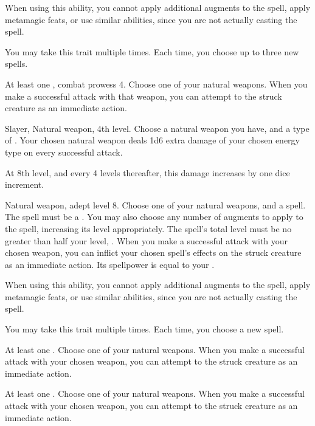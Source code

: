     When using this ability, you cannot apply additional augments to the spell, apply metamagic feats, or use similar abilities, since you are not actually casting the spell.

     You may take this trait multiple times.
    Each time, you choose up to three new spells.

    \featpre At least one , combat prowess 4.
    \featben Choose one of your natural weapons.
    When you make a successful attack with that weapon, you can attempt to  the struck creature as an immediate action.

    \featpre Slayer, Natural weapon, 4th level.
     Choose a natural weapon you have, and a type of .
    \featben Your chosen natural weapon deals 1d6 extra damage of your chosen energy type on every successful attack.

    At 8th level, and every 4 levels thereafter, this damage increases by one dice increment.

    \featpres Natural weapon, adept level 8.
     Choose one of your natural weapons, and a spell.
    The spell must be a .
    You may also choose any number of augments to apply to the spell, increasing its level appropriately.
    The spell's total level must be no greater than half your level, .
    \featben When you make a successful attack with your chosen weapon, you can inflict your chosen spell's effects on the struck creature as an immediate action.
    Its spellpower is equal to your .

    When using this ability, you cannot apply additional augments to the spell, apply metamagic feats, or use similar abilities, since you are not actually casting the spell.

     You may take this trait multiple times.
    Each time, you choose a new spell.

    \featpre At least one .
     Choose one of your natural weapons.
    \featben When you make a successful attack with your chosen weapon, you can attempt to  the struck creature as an immediate action.

    \featpre At least one .
     Choose one of your natural weapons.
    \featben When you make a successful attack with your chosen weapon, you can attempt to  the struck creature as an immediate action.

